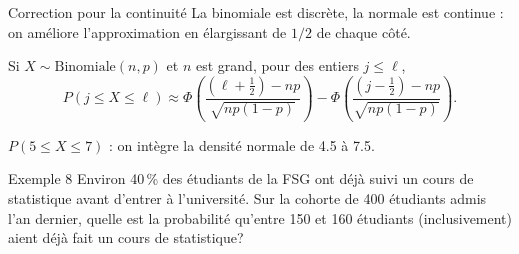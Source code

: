 \documentclass{BeamerTemplate}
\begin{document}
\begin{frame}[t]{Correction pour la continuité}
  La binomiale est \alert{discrète}, la normale est \alert{continue} : on
  améliore l'approximation en élargissant de $1/2$ de chaque côté.

  \begin{prp}
    Si $X \sim \text{Binomiale}(n, p)$ et $n$ est grand, pour des entiers
    $j \le \ell$,
    \[
      P(j \le X \le \ell) \approx
      \Phi\!\left(\frac{(\ell + \frac{1}{2}) - np}{\sqrt{np(1-p)}}\right) -
      \Phi\!\left(\frac{(j - \frac{1}{2}) - np}{\sqrt{np(1-p)}}\right).
    \]
  \end{prp}

  \centering

  {\scriptsize $P(5 \le X \le 7)$ : on intègre la densité normale de 4.5 à 7.5.}
\end{frame}

\begin{frame}[t]{Exemple 8}
  Environ 40\,\% des étudiants de la FSG ont déjà suivi un cours de
  statistique avant d'entrer à l'université. Sur la cohorte de 400 étudiants
  admis l'an dernier, quelle est la probabilité qu'entre 150 et 160 étudiants
  (inclusivement) aient déjà fait un cours de statistique?
\end{frame}
\end{document}
